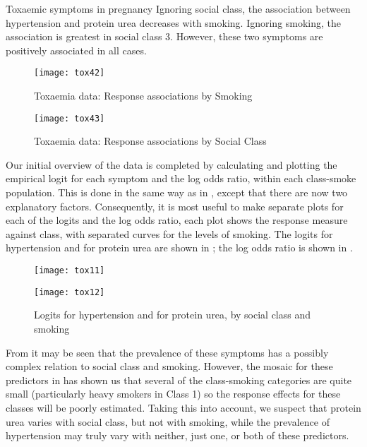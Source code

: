 \begin{Example}[toxaemia]{Toxaemic symptoms in pregnancy}
Ignoring social class, the association between hypertension and protein urea
decreases with smoking.
Ignoring smoking, the association is greatest in social class 3.
However, these two symptoms are positively associated in all cases.

\begin{figure}[htb]
  \centering
  \texttt{[image: tox42]}
  \caption{Toxaemia data: Response associations by Smoking}%
  \label{fig:tox42}
\end{figure}
\begin{figure}[htb]
  \centering
  \texttt{[image: tox43]}
  \caption{Toxaemia data: Response associations by Social Class}%
  \label{fig:tox43}
\end{figure}

Our initial overview of the data is completed
by calculating and plotting the empirical logit for each
symptom and the log odds ratio, within each class-smoke population.
This is done in the same way as in ,
except that there are now two explanatory factors.  Consequently,
it is most useful to make separate plots for each of the logits
and the log odds ratio,
each plot shows the response measure against class, with
separated curves for the levels of smoking.
The logits for hypertension and for protein urea are shown in ; the log odds ratio is shown in .

\begin{figure}[htb]
 \begin{minipage}[t]{.49\linewidth}
  \texttt{[image: tox11]}
 \end{minipage}%
 \hfill
 \begin{minipage}[t]{.49\linewidth}
  \texttt{[image: tox12]}
 \end{minipage}
 \caption{Logits for hypertension and for protein urea, by social class and smoking}\label{fig:tox11}
\end{figure}

From  it may be seen that the prevalence of these
symptoms has a possibly complex relation to social class and smoking.
However, the mosaic for these predictors in  has shown
us that several of the class-smoking categories are quite small
(particularly heavy smokers in Class 1)
so the response effects for these classes will be poorly estimated.
Taking this into account,
we suspect that protein urea varies with social class, but not with
smoking, while the prevalence of hypertension may truly vary with neither,
just one, or both of these predictors.


\end{Example}
